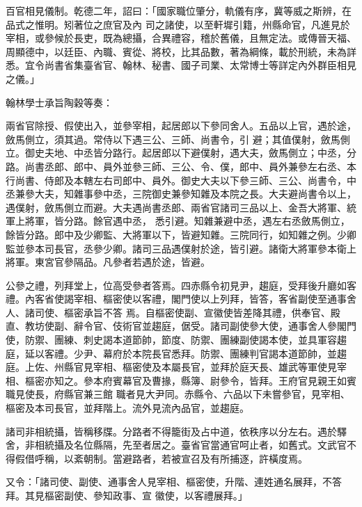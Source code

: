 \begin{pinyinscope}
 百官相見儀制。乾德二年，詔曰：「國家職位肇分，軌儀有序，冀等威之斯辨，在品式之惟明。矧著位之庶官及內
 司之諸使，以至軒墀引籍，州縣命官，凡進見於宰相，或參候於長吏，既為總攝，合異禮容，稽於舊儀，且無定法。或傳晉天福、周顯德中，以廷臣、內職、賓從、將校，比其品數，著為綱條，載於刑統，未為詳悉。宜令尚書省集臺省官、翰林、秘書、國子司業、太常博士等詳定內外群臣相見之儀。」



 翰林學士承旨陶穀等奏：



 兩省官除授、假使出入，並參宰相，起居郎以下參同舍人。五品以上官，遇於途，斂馬側立，須其過。常侍以下遇三公、三師、尚書令，引
 避；其值僕射，斂馬側立。御史夫地、中丞皆分路行。起居郎以下避僕射，遇大夫，斂馬側立；中丞，分路。尚書丞郎、郎中、員外並參三師、三公、令、僕，郎中、員外兼參左右丞、本行尚書、侍郎及本轄左右司郎中、員外。御史大夫以下參三師、三公、尚書令，中丞兼參大夫，知雜事參中丞，三院御史兼參知雜及本院之長。大夫避尚書令以上，遇僕射，斂馬側立而避。大夫遇尚書丞郎、兩省官諸司三品以上、金吾大將軍、統軍上將軍，皆分路。餘官遇中丞，
 悉引避。知雜兼避中丞，遇左右丞斂馬側立，餘皆分路。郎中及少卿監、大將軍以下，皆避知雜。三院同行，如知雜之例。少卿監並參本司長官，丞參少卿。諸司三品遇僕射於途，皆引避。諸衛大將軍參本衛上將軍。東宮官參隔品。凡參者若遇於途，皆避。



 公參之禮，列拜堂上，位高受參者答焉。四赤縣令初見尹，趨庭，受拜後升廳如客禮。內客省使謁宰相、樞密使以客禮，閣門使以上列拜，皆答，客省副使至通事舍人、諸司使、樞密承旨不答
 焉。自樞密使副、宣徽使皆差降其禮，供奉官、殿直、教坊使副、辭令官、伎術官並趨庭，倨受。諸司副使參大使，通事舍人參閣門使，防禦、團練、刺史謁本道節帥，節度、防禦、團練副使謁本使，並具軍容趨庭，延以客禮。少尹、幕府於本院長官悉拜。防禦、團練判官謁本道節帥，並趨庭。上佐、州縣官見宰相、樞密使及本屬長官，並拜於庭天長、雄武等軍使見宰相、樞密亦知之。參本府賓幕官及曹掾，縣簿、尉參令，皆拜。王府官見親王如賓職見使長，府縣官兼三館
 職者見大尹同。赤縣令、六品以下未嘗參官，見宰相、樞密及本司長官，並拜階上。流外見流內品官，並趨庭。



 諸司非相統攝，皆稱移牒。分路者不得籠街及占中道，依秩序以分左右。遇於驛舍，非相統攝及名位縣隔，先至者居之。臺省官當通官呵止者，如舊式。文武官不得假借呼稱，以紊朝制。當避路者，若被宣召及有所捕逐，許橫度焉。



 又令：「諸司使、副使、通事舍人見宰相、樞密使，升階、連姓通名展拜，不答拜。其見樞密副使、參知政事、宣
 徽使，以客禮展拜。」




\end{pinyinscope}
